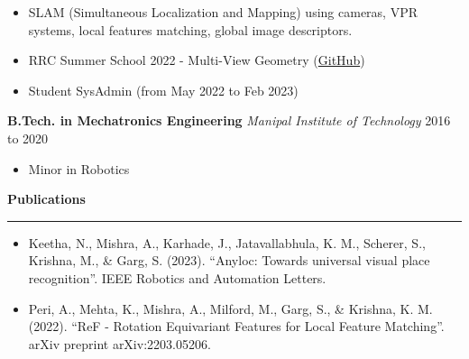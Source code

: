 \documentclass{article}
\newcommand{\newsec}[1]{
    {\bf \large #1}
    \vspace{2mm}
    \hrule
    \vspace{2mm}
}
\newcommand{\expheader}[3]{
    {\bf #1} \hfill {\it #2} \hfill #3
}
\begin{document}
    \begin{itemize}
        \setlength{\itemsep}{0mm}
        \item SLAM (Simultaneous Localization and Mapping) using 
            cameras, VPR systems, local features matching, global
            image descriptors.
        \item RRC Summer School 2022 - Multi-View Geometry (\href{https://github.com/TheProjectsGuy/RRC22-Summer-School-MVG4}{GitHub})
        \item Student SysAdmin (from May 2022 to Feb 2023)
    \end{itemize}
    \expheader{B.Tech. in Mechatronics Engineering}{Manipal Institute 
        of Technology}{2016 to 2020}
    \begin{itemize}
        \setlength{\itemsep}{0mm}
        \item Minor in Robotics
    \end{itemize}
    \newsec{Publications}
    \begin{itemize}
        \setlength{\itemsep}{0mm}
        \item Keetha, N., Mishra, A., Karhade, J., Jatavallabhula, K.
            M., Scherer, S., Krishna, M., \& Garg, S. (2023). 
            ``Anyloc: Towards universal visual place recognition''. 
            IEEE Robotics and Automation Letters.
        \item Peri, A., Mehta, K., Mishra, A., Milford, M., Garg, S., 
            \& Krishna, K. M. (2022). ``ReF - Rotation Equivariant 
            Features for Local Feature Matching''. arXiv preprint 
            arXiv:2203.05206.
    \end{itemize}
\end{document}
